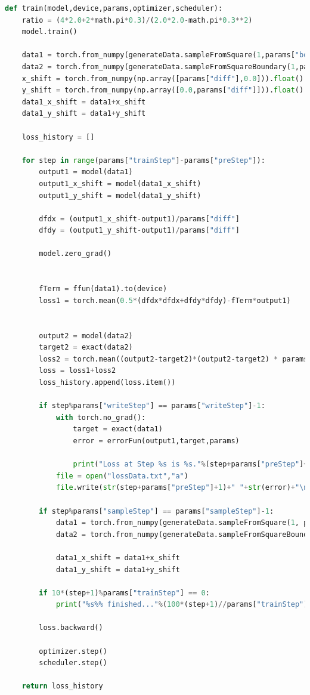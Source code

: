 \documentclass[a4paper,11pt,spanish, twoside, leqno]{tfg-uam}
\theoremstyle{definition}
\begin{document}
\begin{lstlisting}[language=Python]
def train(model,device,params,optimizer,scheduler):
    ratio = (4*2.0+2*math.pi*0.3)/(2.0*2.0-math.pi*0.3**2)
    model.train()

    data1 = torch.from_numpy(generateData.sampleFromSquare(1,params["bodyBatch"])).float().to(device)
    data2 = torch.from_numpy(generateData.sampleFromSquareBoundary(1,params["bdryBatch"])).float().to(device)
    x_shift = torch.from_numpy(np.array([params["diff"],0.0])).float().to(device)
    y_shift = torch.from_numpy(np.array([0.0,params["diff"]])).float().to(device)
    data1_x_shift = data1+x_shift
    data1_y_shift = data1+y_shift

    loss_history = []  

    for step in range(params["trainStep"]-params["preStep"]):
        output1 = model(data1)
        output1_x_shift = model(data1_x_shift)
        output1_y_shift = model(data1_y_shift)

        dfdx = (output1_x_shift-output1)/params["diff"]
        dfdy = (output1_y_shift-output1)/params["diff"]

        model.zero_grad()

        
        fTerm = ffun(data1).to(device)
        loss1 = torch.mean(0.5*(dfdx*dfdx+dfdy*dfdy)-fTerm*output1)

        
        output2 = model(data2)
        target2 = exact(data2)
        loss2 = torch.mean((output2-target2)*(output2-target2) * params["penalty"] * ratio)
        loss = loss1+loss2              
        loss_history.append(loss.item())  

        if step%params["writeStep"] == params["writeStep"]-1:
            with torch.no_grad():
                target = exact(data1)
                error = errorFun(output1,target,params)
                
                print("Loss at Step %s is %s."%(step+params["preStep"]+1,loss.item()))
            file = open("lossData.txt","a")
            file.write(str(step+params["preStep"]+1)+" "+str(error)+"\n")

        if step%params["sampleStep"] == params["sampleStep"]-1:
            data1 = torch.from_numpy(generateData.sampleFromSquare(1, params["bodyBatch"])).float().to(device)
            data2 = torch.from_numpy(generateData.sampleFromSquareBoundary(1, params["bdryBatch"])).float().to(device)

            data1_x_shift = data1+x_shift
            data1_y_shift = data1+y_shift

        if 10*(step+1)%params["trainStep"] == 0:
            print("%s%% finished..."%(100*(step+1)//params["trainStep"]))

        loss.backward()

        optimizer.step()
        scheduler.step()

    return loss_history  

\end{lstlisting}
\end{document}
